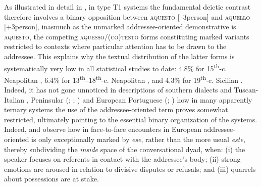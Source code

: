 \documentclass[output=paper]{langsci/langscibook}
\begin{document}
As illustrated in detail in \citet{ledgeway2004sviluppo}, in type T1 systems
the fundamental deictic contrast therefore involves a binary opposition between
\textsc{aquesto} \mbox{[–3person]} and \textsc{aquello} [+3person], inasmuch as the
unmarked addressee-o\-ri\-en\-ted demonstrative is \textsc{aquesto}, the competing
\textsc{aquesso/(co)testo} forms constituting marked variants restricted to
contexts where particular attention has to be drawn to the addressee. This
explains why the textual distribution of the latter forms is systematically
very low in all statistical studies to date: 4.8\% for
15\textsuperscript{th}\nobreakdash-c. Neapolitan \citep{Vincent:1999ab}, 6.4\% for
13\textsuperscript{th}–18\textsuperscript{th}{}-c. Neapolitan
\citep[89]{ledgeway2004sviluppo}, and 4.3\% for 19\textsuperscript{th}{}-c.
Sicilian \citep[92]{ledgeway2004sviluppo}. Indeed, it has not gone unnoticed
in descriptions of southern  dialects and Tuscan-Italian
\citep[68--70]{ledgeway2004sviluppo}, Peninsular 
(\citealt[fn.\ 31]{Eguren:1999a}; \citealt[558f]{Eguren:2012a};
\citealt{Gutierrez-Rexach:2002a,Gutierrez-Rexach:2005a}) and
European Portuguese (\citealt{Teyssier:1980a}; \citealt[325]{Salvi:2011ab})
how in many apparently ternary systems the use of the addressee-oriented term
proves somewhat restricted, ultimately pointing to the essential binary
organization of the systems. Indeed,
\citet[§3.1]{Jungbluth:2017a} and
\citet[245f]{Gomez-Sanchez:2015a} observe how in face-to-face encounters in
European  addressee-oriented  is only exceptionally marked by
\emph{ese}, rather than the more usual \emph{este}, thereby subdividing the
\emph{inside} space of the conversational dyad, when: (i) the speaker focuses
on referents in contact with the addressee’s body; (ii) strong emotions are
aroused in relation to divisive disputes or refusals; and (iii) quarrels about
possessions are at stake.
\end{document}
